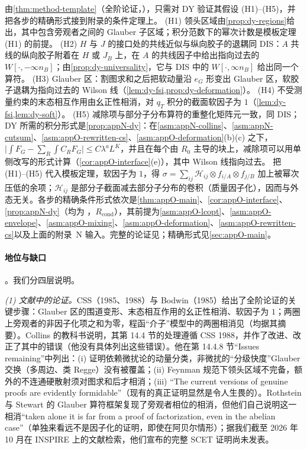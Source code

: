 \begin{proofsketch}
由\cref{thm:method-template}（全阶论证，\tagA），只需对 DY 验证其假设 (H1)--(H5)，并把各步的精确形式接到附录的条件定理上。
(H1) 领头区域由\cref{prop:dy-regions}给出，其中包含旁观者之间的 Glauber 子区域；积分范数下的幂次计数是模板定理 (H1) 的前提。
(H2) $H$ 与 $J$ 的接口处的共线近似与纵向胶子的退耦同 DIS：$A$ 共线的纵向胶子附着在 $H$ 或 $J_B$ 上，在 $A$ 的共线因子中给出指向过去的 $W[\cdot,-\infty n_B]$；由\cref{prop:dy-universality}，它与 DIS 中的 $W[\cdot,\infty n_B]$ 给出同一个算符。
(H3) Glauber 区：割图求和之后把软动量沿 $e_G$ 形变出 Glauber 区，软胶子退耦为指向过去的 Wilson 线（\cref{lem:dy-fsi,prop:dy-deformation}）。
(H4) 不受测量约束的末态相互作用由幺正性相消，对 $q_T$ 积分的截面软因子为 $1$（\cref{lem:dy-fsi,lem:dy-soft}）。
(H5) 减除项与部分子分布算符的重整化矩阵元一致，同 DIS；DY 所需的积分形式是\cref{prop:appN-dy}：在\cref{asm:appN-collins}、\cref{asm:appN-cutsum}、\cref{asm:appO-rewritten-cs}、\cref{asm:appO-deformation}(b)(c) 之下，$\big|\int F_G-\sum_R\int C_RF_G\big|\le C\lambda^aL^K$，并且在每个由 $R_0$ 主导的块上，减除项可以用单侧改写的形式计算（\cref{cor:appO-interface}(e)），其中 Wilson 线指向过去。
把 (H1)--(H5) 代入模板定理，软因子为 $1$，得 $\sigma=\sum_{ij}\mathcal H_{ij}\otimes f_{i/A}\otimes f_{j/B}$ 加上被幂次压低的余项；$\mathcal H_{ij}$ 是部分子截面减去部分子分布的卷积（质量因子化），因而与外态无关。各步的精确条件形式依次是\cref{thm:appO-main}、\cref{cor:appO-interface}、\cref{prop:appN-dy}（均为 \tagR，$R_{\mathrm{cond}}$），其前提为\cref{asm:appO-lcopt}、\cref{asm:appO-envelope}、\cref{asm:appO-mixing}、\cref{asm:appO-deformation}、\cref{asm:appO-rewritten-cs}以及上面的附录~N 输入。完整的论证见\cite[第~14.4~节]{Collins2011}；精确形式见\cref{sec:appO-main}。
\end{proofsketch}

\paragraph{地位与缺口}\tagA。我们分四层说明。

\emph{(1) 文献中的论证。}CSS（1985、1988）与 Bodwin（1985）给出了全阶论证的关键步骤\cite{CollinsSoperSterman1985b,CollinsSoperSterman1988,Bodwin1985}：Glauber 区的围道变形、末态相互作用的幺正性相消、软因子为 $1$；两圈上旁观者的非因子化项之和为零\cite{Lindsay:1982pu,Lindsay:1982gd}，程函“介子”模型中的两圈相消见\cite{Brandt:1988xt}（均据其摘要）。Collins 的教科书说明，其第 14.4 节的处理遵循 CSS 1988，并作了改进、改正了其中的错误（他没有具体列出这些错误）\cite[第~14.4~节，第~553~页]{Collins2011}。他在第 14.4.8 节“Issues remaining”中列出：(i) 证明依赖微扰论的动量分类，非微扰的“分级快度”Glauber 交换（多周边、类 Regge）没有被覆盖；(ii) Feynman 规范下领头区域不完备，额外的不连通硬散射须对图求和后才相消\cite{Labastida:1984gy}；(iii) “The current versions of genuine proofs are evidently formidable”（现有的真正证明显然是令人生畏的）\cite[第~14.4.8~节]{Collins2011}。Rothstein 与 Stewart 的 Glauber 算符框架复现了旁观者相位的相消，但他们自己说明这一相消“taken alone it is far from a proof of factorization, even in the abelian case”（单独来看远不是因子化的证明，即使在阿贝尔情形）\cite[第~11.1~节]{RothsteinStewart2016}；据我们截至 2026 年 10 月在 INSPIRE 上的文献检索，他们宣布的完整 SCET 证明尚未发表。

